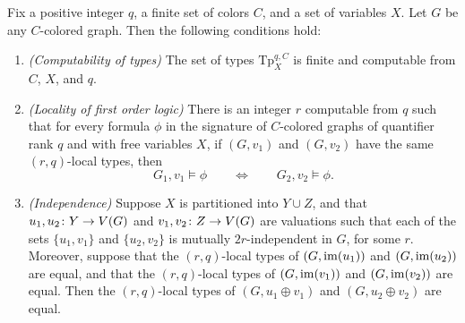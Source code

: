 \begin{proposition}\label{pro:gaifman}
	Fix a positive integer $q$, a finite set of colors $C$, and a set of variables $X$. Let $G$ be any $C$-colored graph. Then the following conditions hold:
 \begin{enumerate}[(1)]
 	\item \emph{(Computability of types)} The set of types $\mathrm{Tp}^{q,C}_X$ is finite and computable from $C$, $X$, and $q$.

	\item \emph{(Locality of first order logic)} There is an integer $r$ computable from $q$ such that for every formula $\phi$ in the signature of $C$-colored graphs  
	of quantifier rank $q$ and with free variables $X$,	
  if $(G,v_1)$ and $(G,v_2)$ have the same $(r,q)$-local types,
	then
	 $$G_1,v_1\models \phi\qquad\iff \qquad G_2,v_2\models \phi.$$



	 \item \emph{(Independence)} Suppose $X$ is partitioned into $Y\cup Z$, 
	 and that $u_1,u_2\colon Y\to V(G)$ and $v_1,v_2\colon Z\to V(G)$ are valuations
   such that each of the sets $\{u_1,v_1\}$ and $\{u_2,v_2\}$
   is mutually $2r$-independent in $G$, for some $r$.
   Moreover, suppose that the $(r,q)$-local types of $(G,\mathrm{im}(u_1))$ and $(G,\mathrm{im}(u_2))$ are equal,
   and that the $(r,q)$-local types of $(G,\mathrm{im}(v_1))$ and $(G,\mathrm{im}(v_2))$ are equal.
   Then the $(r,q)$-local types of $(G,u_1\oplus v_1)$ and $(G,u_2\oplus v_2)$ are equal.
 \end{enumerate}
\end{proposition}


